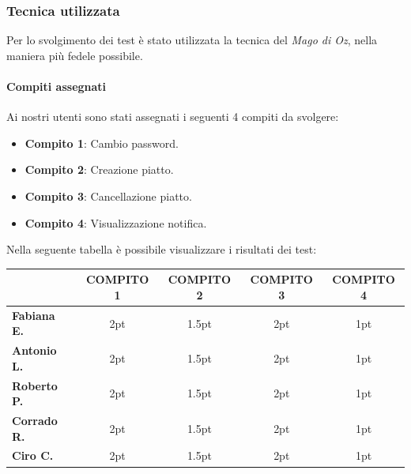\subsubsection{Tecnica utilizzata}
Per lo svolgimento dei test è stato utilizzata la tecnica del \textit{Mago di Oz}, nella maniera più fedele possibile.
\paragraph{Compiti assegnati} Ai nostri utenti sono stati assegnati i seguenti 4 compiti da svolgere:
\begin{itemize}
  \item \textbf{Compito 1}: Cambio password.
  \item \textbf{Compito 2}: Creazione piatto.
  \item \textbf{Compito 3}: Cancellazione piatto.
  \item \textbf{Compito 4}: Visualizzazione notifica.
\end{itemize}
Nella seguente tabella è possibile visualizzare i risultati dei test:
\begin{table}[H]
  \begin{center}
    \def\arraystretch{1.5}
    \begin{tabular}{|l|c|c|c|c|}
      \hline
      &\textbf{COMPITO 1} & \textbf{COMPITO 2} & \textbf{COMPITO 3} & \textbf{COMPITO 4} \\
      \hline
      \textbf{Fabiana E.} & 2pt                & 1.5pt              & 2pt                  & 1pt                \\
      \hline
      \textbf{Antonio L.} & 2pt                & 1.5pt              & 2pt                  & 1pt                \\
      \hline
      \textbf{Roberto P.} & 2pt                & 1.5pt              & 2pt                  & 1pt                \\
      \hline
      \textbf{Corrado R.} & 2pt                & 1.5pt              & 2pt                  & 1pt                \\
      \hline
      \textbf{Ciro C.} & 2pt                & 1.5pt              & 2pt                  & 1pt                \\
      \hline
    \end{tabular}
  \end{center}
\end{table}